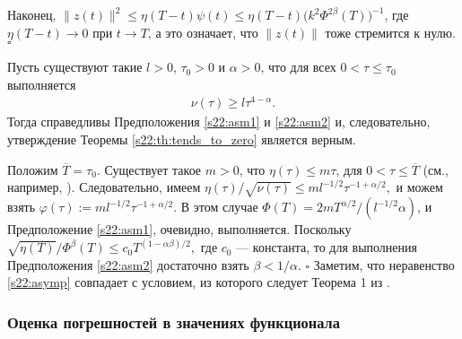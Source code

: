 \documentclass[../main.tex]{subfiles}
\begin{document}
Наконец, $ \|z(t)\|^2 \leqslant \eta(T-t)\psi(t) \leqslant \eta(T-t)\big(k^2\Phi^{2\beta}(T)\big)^{-1} $, 
где $\eta(T-t) \to 0$ при $t \to T$, а это означает, что $\|z(t)\|$ тоже стремится к нулю.
 \hfill $ \square $
\begin{corollary}%
Пусть существуют такие $ l > 0$, $\tau_0 > 0$ и $\alpha > 0$, что для всех $0 < \tau \leqslant \tau_0 $ выполняется
 \begin{gather}\label{s22:asymp}
 \nu(\tau)\geqslant l\tau^{4-\alpha}.
 \end{gather}
 Тогда справедливы Предположения \ref{s22:asm1} и \ref{s22:asm2} и, следовательно, утверждение Теоремы \ref{s22:th:tends_to_zero} является верным.
\end{corollary}
\doc 
Положим $\overline{T}=\tau_0$. 
Существует такое $m>0$, что $\eta(\tau)\leqslant m \tau$, для $0 < \tau \leqslant\overline{T}$ (см., например, \cite{GusevOsipov}). 
Следовательно, имеем $
\eta(\tau)/\sqrt{\nu(\tau)} \leqslant 
 ml^{-1/2}\tau^{-1+\alpha/2},$
и можем взять $\varphi(\tau):= 
 ml^{-1/2}\tau^{-1+\alpha/2}$. 
В этом случае 
$\Phi(T)=2mT^{\alpha/2}/(l^{-1/2}\alpha)$, и Предположение \ref{s22:asm1}, очевидно, выполняется. 
Поскольку 
$\sqrt{\eta(T)}/\Phi^\beta(T) \leqslant c_0T^{(1-\alpha\beta)/2},$
где $c_0$ --- константа, то для выполнения Предположения \ref{s22:asm2} достаточно взять $\beta < 1/\alpha$.
 \hfill $ \square $
Заметим, что неравенство \eqref{s22:asymp} совпадает с условием, из которого следует Теорема 1 из \cite{GusevOsipov}.

\subsubsection{Оценка погрешностей в значениях функционала}
\end{document}
